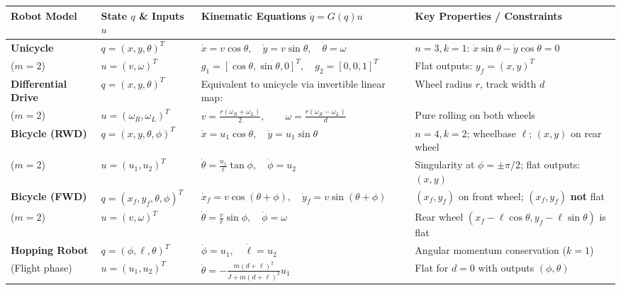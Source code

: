 \documentclass[10pt, a4paper]{article}
\begin{document}
\begin{table}[h!]
\centering
\small
\renewcommand{\arraystretch}{1.25}
\begin{tabularx}{\textwidth}{@{} l l X l @{}}
\toprule
\rowcolor{bglight}
\textbf{Robot Model} & \textbf{State $q$ \& Inputs $u$} & \textbf{Kinematic Equations $\dot{q} = G(q)u$} & \textbf{Key Properties / Constraints} \\
\midrule
\textbf{Unicycle} & $q = (x, y, \theta)^T$ & $\dot{x} = v\cos\theta, \quad \dot{y} = v\sin\theta, \quad \dot{\theta} = \omega$ & $n=3, k=1$: $\dot{x}\sin\theta - \dot{y}\cos\theta = 0$ \\
($m=2$) & $u = (v, \omega)^T$ & $g_1 = [\cos\theta, \sin\theta, 0]^T, \quad g_2 = [0, 0, 1]^T$ & Flat outputs: $y_f = (x, y)^T$ \\
\midrule
\textbf{Differential Drive} & $q = (x, y, \theta)^T$ & Equivalent to unicycle via invertible linear map: & Wheel radius $r$, track width $d$ \\
($m=2$) & $u = (\omega_R, \omega_L)^T$ & $v = \frac{r(\omega_R + \omega_L)}{2}, \qquad \omega = \frac{r(\omega_R - \omega_L)}{d}$ & Pure rolling on both wheels \\
\midrule
\textbf{Bicycle (RWD)} & $q = (x, y, \theta, \phi)^T$ & $\dot{x} = u_1\cos\theta, \quad \dot{y} = u_1\sin\theta$ & $n=4, k=2$; wheelbase $\ell$; $(x,y)$ on rear wheel \\
($m=2$) & $u = (u_1, u_2)^T$ & $\dot{\theta} = \frac{u_1}{\ell}\tan\phi, \quad \dot{\phi} = u_2$ & Singularity at $\phi = \pm \pi/2$; flat outputs: $(x, y)$ \\
\midrule
\textbf{Bicycle (FWD)} & $q = (x_f, y_f, \theta, \phi)^T$ & $\dot{x}_f = v\cos(\theta+\phi), \quad \dot{y}_f = v\sin(\theta+\phi)$ & $(x_f, y_f)$ on front wheel; $(x_f, y_f)$ \textbf{not} flat \\
($m=2$) & $u = (v, \omega)^T$ & $\dot{\theta} = \frac{v}{\ell}\sin\phi, \quad \dot{\phi} = \omega$ & Rear wheel $(x_f - \ell\cos\theta, y_f - \ell\sin\theta)$ is flat \\
\midrule
\textbf{Hopping Robot} & $q = (\phi, \ell, \theta)^T$ & $\dot{\phi} = u_1, \quad \dot{\ell} = u_2$ & Angular momentum conservation ($k=1$) \\
(Flight phase) & $u = (u_1, u_2)^T$ & $\dot{\theta} = -\frac{m(d+\ell)^2}{J + m(d+\ell)^2} u_1$ & Flat for $d=0$ with outputs $(\phi, \theta)$ \\
\bottomrule
\end{tabularx}
\end{table}
\end{document}
